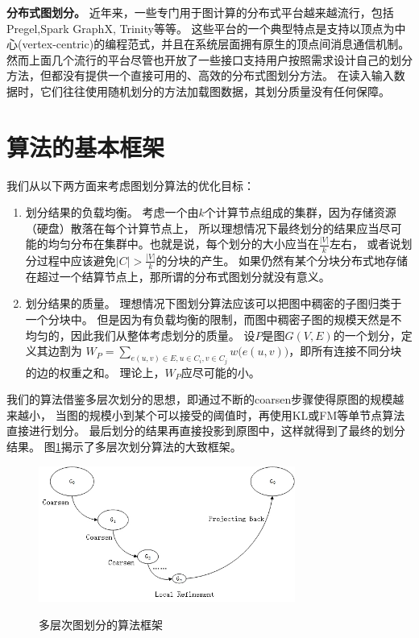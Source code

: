 \documentclass[master]{njuthesis}
\begin{document}
\textbf{分布式图划分。 } 近年来，一些专门用于图计算的分布式平台越来越流行，包括Pregel\cite{malewicz2010pregel},Spark GraphX\cite{DBLP:conf/osdi/GonzalezXDCFS14}, Trinity\cite{shao2012trinity}等等。
这些平台的一个典型特点是支持以顶点为中心(vertex-centric)的编程范式，并且在系统层面拥有原生的顶点间消息通信机制。
然而上面几个流行的平台尽管也开放了一些接口支持用户按照需求设计自己的划分方法，但都没有提供一个直接可用的、高效的分布式图划分方法。
在读入输入数据时，它们往往使用随机划分的方法加载图数据，其划分质量没有任何保障。

\section{算法的基本框架}
我们从以下两方面来考虑图划分算法的优化目标：
\begin{enumerate}
 \item 划分结果的负载均衡。 考虑一个由$k$个计算节点组成的集群，因为存储资源（硬盘）散落在每个计算节点上，
 所以理想情况下最终划分的结果应当尽可能的均匀分布在集群中。也就是说，每个划分的大小应当在$\frac{|V|}{k}$左右，
 或者说划分过程中应该避免$|C| > \frac{|V|}{k}$的分块的产生。
 如果仍然有某个分块分布式地存储在超过一个结算节点上，那所谓的分布式图划分就没有意义。
 \item 划分结果的质量。 理想情况下图划分算法应该可以把图中稠密的子图归类于一个分块中。
 但是因为有负载均衡的限制，而图中稠密子图的规模天然是不均匀的，因此我们从整体考虑划分的质量。
 设$P$是图$G(V,E)$的一个划分，定义其边割为
 $W_{P}=\sum\nolimits_{e(u,v) \in E, u \in C_i, v \in C_j} w\big(e(u,v)\big)$，即所有连接不同分块的边的权重之和。
 理论上，$W_P$应尽可能的小。
\end{enumerate}
我们的算法借鉴多层次划分的思想，即通过不断的coarsen步骤使得原图的规模越来越小，
当图的规模小到某个可以接受的阈值时，再使用KL或FM等单节点算法直接进行划分。
最后划分的结果再直接投影到原图中，这样就得到了最终的划分结果。
图\ref{fig:mlp_framework}揭示了多层次划分算法的大致框架。
\begin{figure}[h]
  \centering
  \includegraphics[width= 0.75\textwidth]{figure/coarsen.jpg}\\
  \caption{多层次图划分的算法框架}
   \label{fig:mlp_framework}
\end{figure}
\end{document}
